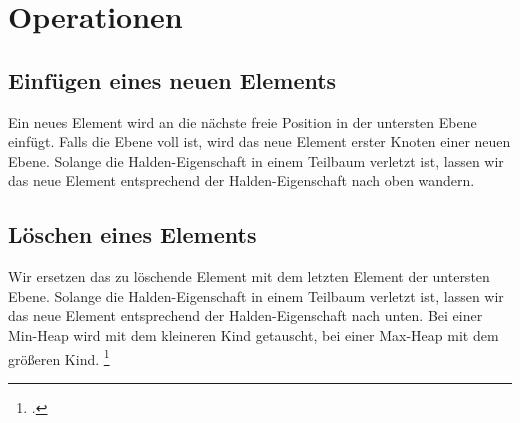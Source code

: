 \documentclass{lehramt-informatik-haupt}
\begin{document}
\begin{center}
\end{center}

%

\section{Operationen}

%

\subsection{Einfügen eines neuen Elements}

Ein neues Element wird an die nächste freie Position in der untersten
Ebene einfügt. Falls die Ebene voll ist, wird das neue Element erster
Knoten einer neuen Ebene. Solange die Halden-Eigenschaft in einem
Teilbaum verletzt ist, lassen wir das neue Element entsprechend der
Halden-Eigenschaft nach oben wandern.

%

\subsection{Löschen eines Elements}

Wir ersetzen das zu löschende Element mit dem letzten Element der
untersten Ebene.
%
Solange die Halden-Eigenschaft in einem Teilbaum verletzt ist, lassen
wir das neue Element entsprechend der Halden-Eigenschaft nach unten.
%
Bei einer Min-Heap wird mit dem kleineren Kind getauscht, bei einer
Max-Heap mit dem größeren Kind.
\footcite[Seite 28]{aud:fs:tafeluebung-11}

\literatur
\end{document}

